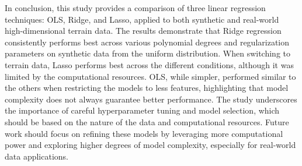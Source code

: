 In conclusion, this study provides a comparison of three linear regression techniques: OLS, Ridge, and Lasso, applied to both synthetic and real-world high-dimensional terrain data. The results demonstrate that Ridge regression consistently performs best across various polynomial degrees and regularization parameters on synthetic data from the uniform distribution. When switching to terrain data, Lasso performs best across the different conditions, although it was limited by the computational resources. OLS, while simpler, performed similar to the others when restricting the models to less features, highlighting that model complexity does not always guarantee better performance. The study underscores the importance of careful hyperparameter tuning and model selection, which should be based on the nature of the data and computational resources. Future work should focus on refining these models by leveraging more computational power and exploring higher degrees of model complexity, especially for real-world data applications.